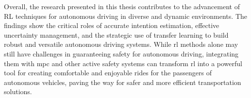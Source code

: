 
Overall, the research presented in this thesis contributes to the advancement of RL techniques for autonomous driving in diverse and dynamic environments. The findings show the critical roles of accurate intention estimation, effective uncertainty management, and the strategic use of transfer learning to build robust and versatile autonomous driving systems. While \Gls{rl} methods alone may still have challenges in guaranteeing safety for autonomous driving, integrating them with \gls{mpc} and other active safety systems can transform \gls{rl} into a powerful tool for creating comfortable and enjoyable rides for the passengers of autonomous vehicles, paving the way for safer and more efficient transportation solutions.

